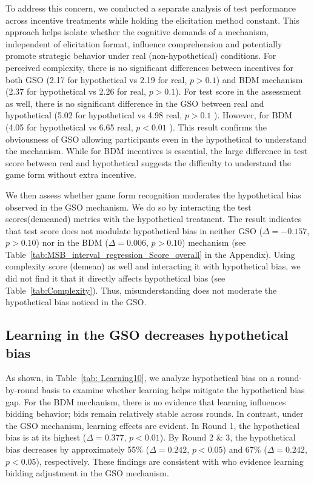 \documentclass[12pt]{article}
\begin{document}
To address this concern, we conducted a separate analysis of test performance across incentive treatments while holding the elicitation method constant. This approach helps isolate whether the cognitive demands of a mechanism, independent of elicitation format, influence comprehension and potentially promote strategic behavior under real (non-hypothetical) conditions. For perceived complexity, there is no significant differences between incentives for both GSO (2.17 for hypothetical vs 2.19 for real, \(p > 0.1\)) and BDM mechanism (2.37 for hypothetical vs 2.26 for real, \(p > 0.1\)). For test score in the assessment as well, there is no significant difference in the GSO between real and hypothetical (5.02 for hypothetical vs 4.98 real, \(p > 0.1\) ). However,  for BDM (4.05 for hypothetical vs 6.65 real, \(p < 0.01\) ). This result confirms the obviousness of GSO allowing participants even in the hypothetical to understand the mechanism. While for BDM incentives is essential, the large difference in test score between real and hypothetical suggests the difficulty to understand the game form without extra incentive.  

We then assess whether game form recognition moderates the hypothetical bias observed in the GSO mechanism. We do so by interacting the test scores(demeaned) metrics with the hypothetical treatment. 
The result indicates that test score does not modulate hypothetical bias in neither GSO (\(\Delta = -0.157\), \(p > 0.10\))  nor in the BDM (\(\Delta = 0.006\), \(p > 0.10\)) mechanism (see Table~\ref{tab:MSB_interval_regression_Score_overall} in the Appendix). Using complexity score (demean) as well and interacting it with hypothetical bias, we did not find it that it directly affects hypothetical bias (see Table~\ref{tab:Complexity}). Thus, misunderstanding does not moderate the hypothetical bias noticed in the GSO. 




\subsection{Learning in the GSO decreases hypothetical bias}
\label{Sec: learning}
As shown, in Table~\ref{tab: Learning10}, we analyze hypothetical bias on a round-by-round basis to examine whether learning helps mitigate the hypothetical bias gap. For the BDM mechanism, there is no evidence that learning influences bidding behavior; bids remain relatively stable across rounds.
In contrast, under the GSO mechanism, learning effects are evident. In Round 1, the hypothetical bias is at its highest (\(\Delta = 0.377\), \(p < 0.01\)). By Round 2 \& 3, the hypothetical bias decreases by approximately 55\% (\(\Delta = 0.242\), \(p < 0.05\)) and 67\% (\(\Delta = 0.242\), \(p < 0.05\)), respectively. These findings are consistent with \citet{brown_is_2023} who evidence learning bidding adjustment in the GSO mechanism. 
\end{document}
